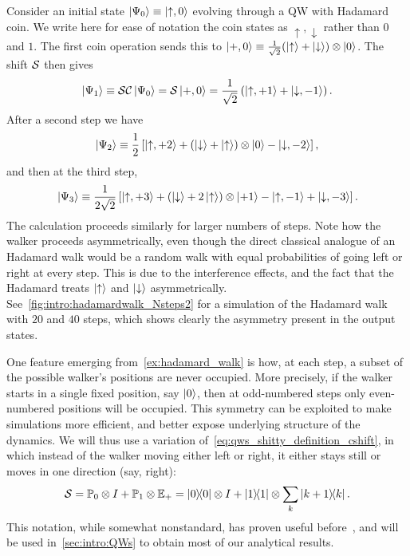 \begin{example}[label=ex:hadamard_walk]
Consider an initial state $\ket{\Psi_0}\equiv\ket{\uparrow,0}$ evolving through a QW with Hadamard coin. We write here for ease of notation the coin states as $\uparrow,\downarrow$ rather than $0$ and $1$.
The first coin operation sends this to $\ket{+,0}\equiv\frac{1}{\sqrt2}(\ket\uparrow+\ket\downarrow)\otimes\ket0$. The shift ${\mathcal{S}}$ then gives
\begin{equation}
    \ket{\Psi_1} \equiv 
    {\mathcal{S}}{\mathcal{C}}\ket{\Psi_0} =
    {\mathcal{S}}\ket{+,0} =
    \frac{1}{\sqrt2} \left( \ket{\uparrow,+1} + \ket{\downarrow, -1} \right).
\end{equation}
After a second step we have
\begin{equation}
    \ket{\Psi_2} \equiv
    \frac12\left[
        \ket{\uparrow,+2} +
        (\ket{\downarrow}
        + \ket{\uparrow})\otimes \ket{0}
        - \ket{\downarrow, -2}
    \right],
\end{equation}
and then at the third step,
\begin{equation}
    \ket{\Psi_3} \equiv
    \frac{1}{2\sqrt2}\left[
        \ket{\uparrow,+3} +
        (\ket{\downarrow} + 2\ket{\uparrow})\otimes \ket{+1}
        - \ket{\uparrow,-1}
        + \ket{\downarrow,-3}
    \right].
\end{equation}
The calculation proceeds similarly for larger numbers of steps.
Note how the walker proceeds asymmetrically, even though the direct classical analogue of an Hadamard walk would be a random walk with equal probabilities of going left or right at every step.
This is due to the interference effects, and the fact that the Hadamard treats $\ket\uparrow$ and $\ket\downarrow$ asymmetrically.
See~\cref{fig:intro:hadamardwalk_Nsteps2} for a simulation of the Hadamard walk with $20$ and $40$ steps, which shows clearly the asymmetry present in the output states.
\end{example}

One feature emerging from~\cref{ex:hadamard_walk} is how, at each step, a subset of the possible walker's positions are never occupied. More precisely, if the walker starts in a single fixed position, say $\ket0$, then at odd-numbered steps only even-numbered positions will be occupied.
This symmetry can be exploited to make simulations more efficient, and better expose underlying structure of the dynamics.
We will thus use a variation of~\cref{eq:qws_shitty_definition_cshift}, in which instead of the walker moving either left or right, it either stays still or moves in one direction (say, right):
\begin{equation}
    {\mathcal{S}} = {\mathbb{P}}_0\otimes I + {\mathbb{P}}_1\otimes {\mathbb{E}}_+
    =\ketbra0\otimes I +\ketbra1\otimes\sum_k\ketbra{k+1}{k}.
\end{equation}
This notation, while somewhat nonstandard, has proven useful before~\cite{hoyer2009faster,montero2013unidirectional,montero2015quantum}, and will be used in~\cref{sec:intro:QWs} to obtain most of our analytical results.

